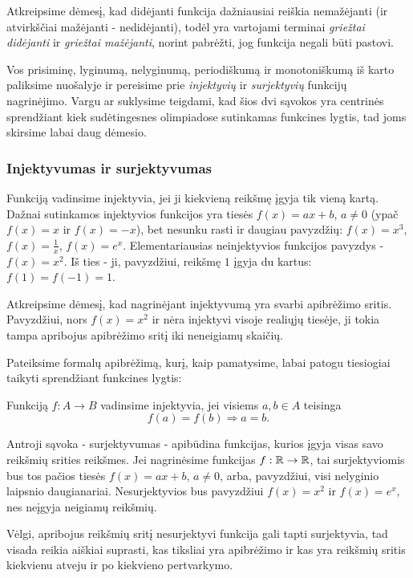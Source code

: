 Atkreipsime dėmesį, kad didėjanti funkcija dažniausiai reiškia nemažėjanti
(ir atvirkščiai mažėjanti - nedidėjanti), todėl yra vartojami terminai
\emph{griežtai didėjanti} ir \emph{griežtai mažėjanti}, norint pabrėžti,
jog funkcija negali būti pastovi.

Vos prisiminę, lyginumą, nelyginumą, periodiškumą ir monotoniškumą iš karto
paliksime nuošalyje ir pereisime prie \emph{injektyvių} ir
\emph{surjektyvių} funkcijų nagrinėjimo. Vargu ar suklysime teigdami, kad
šios dvi sąvokos yra centrinės sprendžiant kiek sudėtingesnes olimpiadose
sutinkamas funkcines lygtis, tad joms skirsime labai daug dėmesio.

\subsubsection{Injektyvumas ir surjektyvumas}

Funkciją vadinsime injektyvia, jei ji kiekvieną reikšmę įgyja tik vieną
kartą. Dažnai sutinkamos injektyvios funkcijos yra tiesės $f(x)=ax +
b$, $a\neq 0$ (ypač $f(x)=x$ ir $f(x)=-x$), bet nesunku rasti ir daugiau pavyzdžių:
$f(x)=x^3$, $f(x)=\frac{1}{x}$, $f(x)=e^{x}$. Elementariausias
neinjektyvios funkcijos pavyzdys - $f(x)=x^2$. Iš ties - ji, pavyzdžiui,
reikšmę $1$ įgyja du kartus: $f(1)=f(-1)=1$.

Atkreipsime dėmesį, kad nagrinėjant injektyvumą yra svarbi apibrėžimo
sritis. Pavyzdžiui, nors $f(x)=x^2$ ir nėra injektyvi visoje realiųjų
tiesėje, ji tokia tampa apribojus apibrėžimo sritį iki neneigiamų skaičių.

Pateiksime formalų apibrėžimą, kurį, kaip pamatysime, labai patogu
tiesiogiai taikyti sprendžiant funkcines lygtis:

\begin{api}
Funkciją $f:A\to B$ vadinsime injektyvia, jei visiems $a,b \in A$ teisinga $$f(a)=f(b) \Rightarrow a=b.$$
\end{api}

Antroji sąvoka - surjektyvumas - apibūdina funkcijas, kurios įgyja visas
savo reikšmių srities reikšmes. Jei nagrinėsime funkcijas $f:\mathbb R \to \mathbb R$,
tai surjektyviomis bus tos pačios tiesės $f(x)=ax +b$, $a\neq 0$, arba,
pavyzdžiui, visi nelyginio laipsnio daugianariai. Nesurjektyvios bus
pavyzdžiui $f(x)=x^2$ ir $f(x)=e^x$, nes neįgyja neigiamų reikšmių.

Vėlgi, apribojus reikšmių sritį nesurjektyvi funkcija gali tapti
surjektyvia, tad visada reikia aiškiai suprasti, kas tiksliai yra
apibrėžimo ir kas yra reikšmių sritis kiekvienu atveju ir po kiekvieno
pertvarkymo.

